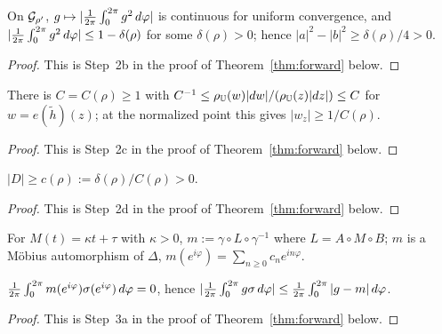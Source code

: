 \begin{lemma}\label{lem:circleAvg_sq_lt_one}
	On $\mathcal{G}_{\rho'}$, $g\mapsto|\frac{1}{2\pi}\int_0^{2\pi} g^2 \,d\varphi|$ is continuous for uniform convergence, and $|\frac{1}{2\pi}\int_0^{2\pi} g^2 \,d\varphi|\le1-\delta(\rho)$ for some $\delta(\rho)>0$; hence $|a|^2-|b|^2\ge\delta(\rho)/4>0$.
\end{lemma}
\begin{proof}
	This is Step~2b in the proof of Theorem~\ref{thm:forward} below.
\end{proof}

\begin{lemma}\label{lem:wirtZ_lower_bound}
	There is $C=C(\rho)\ge1$ with $C^{-1}\le\rho_{\mathbb{U}}(w)|dw|/(\rho_{\mathbb{U}}(z)|dz|)\le C$ for $w=e(\tilde h)(z)$; at the normalized point this gives $|w_z|\ge1/C(\rho)$.
\end{lemma}
\begin{proof}
	This is Step~2c in the proof of Theorem~\ref{thm:forward} below.
\end{proof}

\begin{lemma}\label{lem:muDenominator_lower_bound}
	$|D|\ge c(\rho):=\delta(\rho)/C(\rho)>0$.
\end{lemma}
\begin{proof}
	This is Step~2d in the proof of Theorem~\ref{thm:forward} below.
\end{proof}

\begin{definition}\label{def:IsDiskAut}
	For $M(t)=\kappa t+\tau$ with $\kappa>0$, $m:=\gamma\circ L\circ\gamma^{-1}$ where $L=A\circ M\circ B$; $m$ is a M\"obius automorphism of $\Delta$, $m(e^{i\varphi})=\sum_{n\ge0}c_ne^{in\varphi}$.
\end{definition}

\begin{lemma}\label{lem:circleAvg_g_mul_id_le}
	$\frac{1}{2\pi}\int_0^{2\pi} m(e^{i\varphi})\sigma(e^{i\varphi}) \,d\varphi=0$, hence $|\frac{1}{2\pi}\int_0^{2\pi} g\sigma \,d\varphi|\le\frac{1}{2\pi}\int_0^{2\pi} |g-m| \,d\varphi$.
\end{lemma}
\begin{proof}
	This is Step~3a in the proof of Theorem~\ref{thm:forward} below.
\end{proof}

